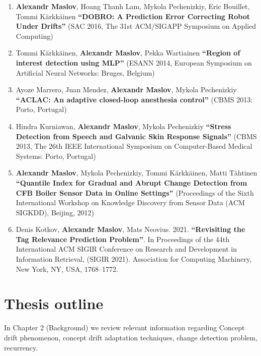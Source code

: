\begin{enumerate}[leftmargin=0.2cm]
  \item \textbf{Alexandr Maslov}, Hoang Thanh Lam, Mykola Pechenizkiy, Eric Bouillet, Tommi K\"{a}rkk\"{a}inen \textbf{``DOBRO: A Prediction Error Correcting Robot Under Drifts''} (SAC 2016, The 31st ACM/SIGAPP Symposium on Applied Computing)

  \item Tommi K\"{a}rkk\"{a}inen, \textbf{Alexandr Maslov}, Pekka Wartiainen
\textbf{``Region of interest detection using MLP''} (ESANN 2014, European Symposium on Artificial Neural Networks: Bruges, Belgium)

  \item Ayoze Marrero, Juan Mendez, \textbf{Alexandr Maslov}, Mykola Pechenizkiy \textbf{``ACLAC: An adaptive closed-loop anesthesia control''} (CBMS 2013: Porto, Portugal)

  \item Hindra Kurniawan, \textbf{Alexandr Maslov}, Mykola Pechenizkiy \textbf{``Stress Detection from Speech and Galvanic Skin Response Signals''} (CBMS 2013, The 26th IEEE International Symposium on Computer-Based Medical Systems: Porto, Portugal)

  \item \textbf{Alexandr Maslov}, Mykola Pechenizkiy, Tommi K\"{a}rkk\"{a}inen, Matti T\"{a}htinen
\textbf{``Quantile Index for Gradual and Abrupt Change Detection from CFB Boiler Sensor Data in Online Settings''}
(Proceedings of the Sixth International Workshop on Knowledge Discovery from Sensor Data (ACM SIGKDD), Beijing, 2012)

  \item Denis Kotkov, \textbf{Alexandr Maslov}, Mats Neovius. 2021. \textbf{``Revisiting the Tag Relevance Prediction Problem''}. In Proceedings of the 44th International ACM SIGIR Conference on Research and Development in Information Retrieval, (SIGIR 2021). Association for Computing Machinery, New York, NY, USA, 1768–1772. %
\end{enumerate}

\section{Thesis outline}



In Chapter 2 (Background) we review relevant information regarding Concept drift phenomenon, concept drift adaptation techniques, change detection problem, recurrency.

